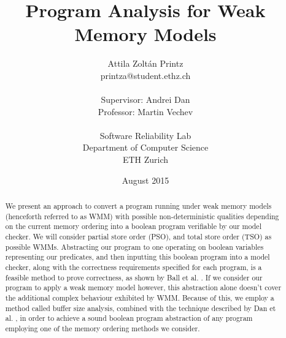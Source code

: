 \documentclass{article}
\begin{document}
\title{Program Analysis for Weak Memory Models}

\author
{
	Attila Zolt\'an Printz \\
	printza@student.ethz.ch \\
	\\
	Supervisor: Andrei Dan \\
	Professor: Martin Vechev \\
	\\
	Software Reliability Lab \\
	Department of Computer Science \\
	ETH Zurich
}

\date{August 2015}
\maketitle

\begin{abstract}

	We present an approach to convert a program running under weak memory models (henceforth referred to as WMM) with possible non-deterministic qualities depending on the current memory ordering into a boolean program verifiable by our model checker. We will consider partial store order (PSO), and total store order (TSO) as possible WMMs. Abstracting our program to one operating on boolean variables representing our predicates, and then inputting this boolean program into a model checker, along with the correctness requirements specified for each program, is a feasible method to prove correctness, as shown by Ball et al. \cite{balletal01}. If we consider our program to apply a weak memory model however, this abstraction alone doesn't cover the additional complex behaviour exhibited by WMM. Because of this, we employ a method called buffer size analysis, combined with the technique described by Dan et al. \cite{danetal13}, in order to achieve a sound boolean program abstraction of any program employing one of the memory ordering methods we consider.

\end{abstract}













\pagebreak
\end{document}
